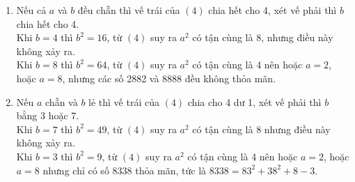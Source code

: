 \begin{bt}
{\begin{enumerate}[$ \bullet $]
			\item Nếu cả $ a $ và $ b $ đều chẵn thì vế trái của $ (4) $ chia hết cho 4, xét vế phải thì $ b $ chia hết cho 4.\\
			Khi $ b=4 $ thì $ b^2=16 $, từ $ (4) $ suy ra $ a^2 $ có tận cùng là 8, nhưng điều này không xảy ra.\\
			Khi $ b=8 $ thì $ b^2=64 $, từ $ (4) $ suy ra $ a^2 $ có tận cùng là 4 nên hoặc $ a=2 $, hoặc $ a=8 $, nhưng các số 2882 và 8888 đều không thỏa mãn.
			\item Nếu $ a $ chẵn và $ b $ lẻ thì vế trái của $ (4) $ chia cho 4 dư 1, xét vế phải thì $ b $ bằng 3 hoặc 7. \\
			Khi $ b=7 $ thì $ b^2=49 $, từ $ (4) $ suy ra $ a^2 $ có tận cùng là 8 nhưng điều này không xảy ra.\\
			Khi $ b=3 $ thì $ b^2=9 $, từ $ (4) $ suy ra $ a^2 $ có tận cùng là 4 nên hoặc $ a=2 $, hoặc $ a=8 $ nhưng chỉ có số 8338 thỏa mãn, tức là $ 8338=83^2+38^2+8-3 $.	
		\end{enumerate}
	}
\end{bt}

